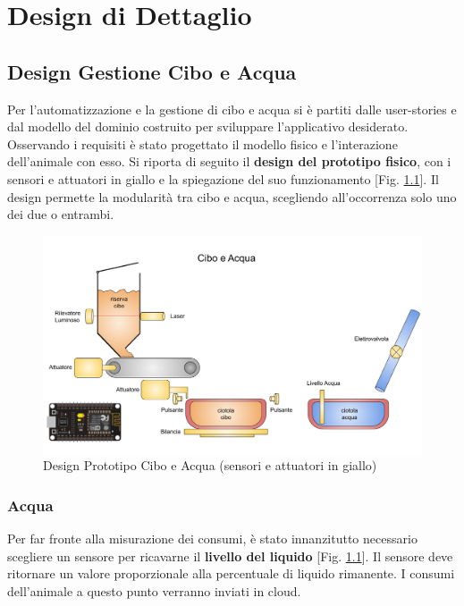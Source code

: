 \chapter{Design di Dettaglio}

\section{Design Gestione Cibo e Acqua}
    Per l'automatizzazione e la gestione di cibo e acqua si è partiti dalle user-stories e dal modello del dominio costruito per sviluppare l'applicativo desiderato. Osservando i requisiti è stato progettato il modello fisico e l'interazione dell'animale con esso. 
    Si riporta di seguito il \textbf{design del prototipo fisico}, con i sensori e attuatori in giallo e la spiegazione del suo funzionamento [Fig. \ref{fig:ciboacqua}].
    Il design permette la modularità tra cibo e acqua, scegliendo all'occorrenza solo uno dei due o entrambi.
    \begin{figure}[H]
        \caption{Design Prototipo Cibo e Acqua (sensori e attuatori in giallo)}
        \label{fig:ciboacqua}
        \centering
        \includegraphics[width=1\textwidth]{Images/CiboAcqua.png}
    \end{figure}
    
    \subsection{Acqua}
    Per far fronte alla misurazione dei consumi, è stato innanzitutto necessario scegliere un sensore per ricavarne il \textbf{livello del liquido} [Fig. \ref{fig:ciboacqua}]. Il sensore deve ritornare un valore proporzionale alla percentuale di liquido rimanente. I consumi dell'animale a questo punto verranno inviati in cloud.
    

